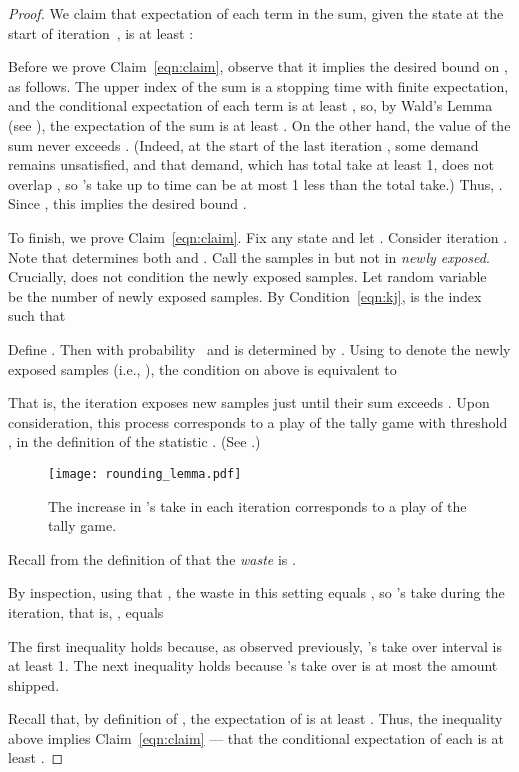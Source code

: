 \begin{proof}
  We claim that expectation of each term  in the sum,
  given the state at the start of iteration~, is at least :

  

  Before we prove Claim~\eqref{eqn:claim},
  observe that it implies the desired bound on , as follows.
  The upper index  of the sum 
  is a stopping time with finite expectation,
  and the conditional expectation of each term is at least ,
  so, by Wald's Lemma (see ),
  the expectation of the sum is at least .
  On the other hand,  the value of the sum never exceeds .
  (Indeed,   at the start of the last iteration , 
  some demand  remains unsatisfied,
  and that demand, which has total take at least 1,
  does not overlap ,
  so 's take up to time  can be at most 1 less than the total take.)
  Thus, .
  Since , this implies the desired bound .

  To finish, we prove Claim~\eqref{eqn:claim}.
  Fix any state  and  let .
  Consider iteration .
  Note that  determines both  and .
  Call the samples in  but not in  {\em newly exposed}.
  Crucially,  does not condition the newly exposed samples.
  Let random variable~ be the number of newly exposed samples.
  By Condition~\eqref{eqn:kj},  is the index such that
  

  Define . Then  with probability~ and 
  is determined by .
  Using  to denote the newly exposed samples (i.e., ),
  the condition on  above is equivalent to

  

\noindent
  That is, the iteration exposes new samples just until their sum exceeds .
  Upon consideration, this process corresponds to a play of the tally game with threshold ,
  in the definition of the statistic .
  (See .)
\begin{figure}[t]
    \centering
    \texttt{[image: rounding\_lemma.pdf]}
\caption{The increase in 's take in each iteration corresponds to a play of the tally game.}
    \label{fig:tally}
  \end{figure}
Recall from the definition of 
  that the {\em waste} is .

  By inspection, using that ,
  the waste  in this setting equals ,
  so 's take  during the iteration,  that is, , equals

  

  The first inequality holds because,
  as observed previously, 's take over interval  is at least 1.
  The next inequality holds because
  's take over  is at most the amount shipped.

  Recall that, by definition of ,
  the expectation of  is at least .
  Thus, the inequality above implies Claim~\eqref{eqn:claim} --- that
  the conditional expectation of each  is at least .
\end{proof}

